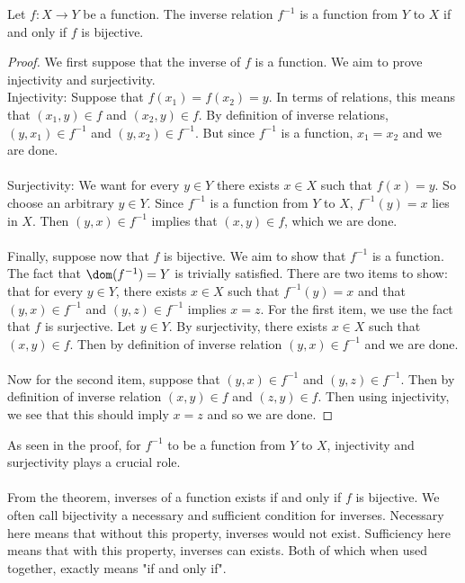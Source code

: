 \documentclass[a4paper]{article}
\begin{document}
\begin{thm}{}{} Let $f:X\to Y$ be a function. The inverse relation $f^{-1}$ is a function from $Y$ to $X$ if and only if $f$ is bijective. \tcbline
\begin{proof}
We first suppose that the inverse of $f$ is a function. We aim to prove injectivity and surjectivity. \\
Injectivity: Suppose that $f(x_1)=f(x_2)=y$. In terms of relations, this means that $(x_1,y)\in f$ and $(x_2,y)\in f$. By definition of inverse relations, $(y,x_1)\in f^{-1}$ and $(y,x_2)\in f^{-1}$. But since $f^{-1}$ is a function, $x_1=x_2$ and we are done. \\~\\
Surjectivity: We want for every $y\in Y$ there exists $x\in X$ such that $f(x)=y$. So choose an arbitrary $y\in Y$. Since $f^{-1}$ is a function from $Y$ to $X$, $f^{-1}(y)=x$ lies in $X$. Then $(y,x)\in f^{-1}$ implies that $(x,y)\in f$, which we are done. \\~\\

Finally, suppose now that $f$ is bijective. We aim to show that $f^{-1}$ is a function. The fact that $\dom(f^{-1})=Y$ is trivially satisfied. There are two items to show: that for every $y\in Y$, there exists $x\in X$ such that $f^{-1}(y)=x$ and that $(y,x)\in f^{-1}$ and $(y,z)\in f^{-1}$ implies $x=z$. For the first item, we use the fact that $f$ is surjective. Let $y\in Y$. By surjectivity, there exists $x\in X$ such that $(x,y)\in f$. Then by definition of inverse relation $(y,x)\in f^{-1}$ and we are done. \\~\\
Now for the second item, suppose that $(y,x)\in f^{-1}$ and $(y,z)\in f^{-1}$. Then by definition of inverse relation $(x,y)\in f$ and $(z,y)\in f$. Then using injectivity, we see that this should imply $x=z$ and so we are done. 
\end{proof}
\end{thm}

As seen in the proof, for $f^{-1}$ to be a function from $Y$ to $X$, injectivity and surjectivity plays a crucial role. \\~\\
From the theorem, inverses of a function exists if and only if $f$ is bijective. We often call bijectivity a necessary and sufficient condition for inverses. Necessary here means that without this property, inverses would not exist. Sufficiency here means that with this property, inverses can exists. Both of which when used together, exactly means "if and only if". 
\end{document}
